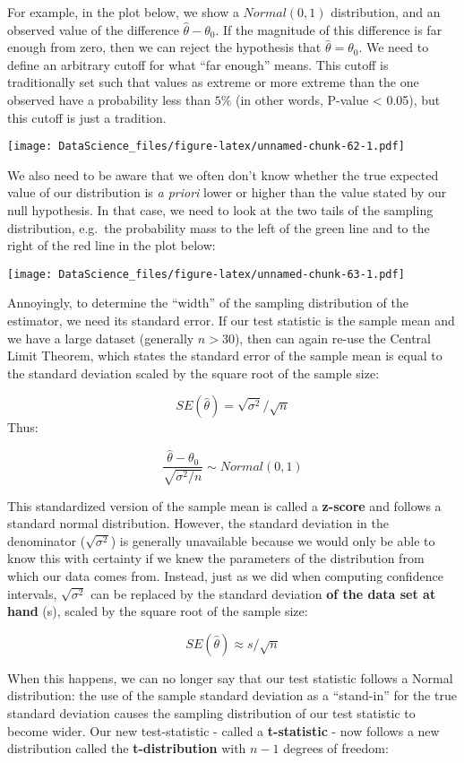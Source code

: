 \documentclass[
]{book}
\begin{document}
For example, in the plot below, we show a \(Normal(0,1)\) distribution, and an observed value of the difference \(\hat{\theta}-\theta_0\). If the magnitude of this difference is far enough from zero, then we can reject the hypothesis that \(\hat{\theta} = \theta_0\). We need to define an arbitrary cutoff for what ``far enough'' means. This cutoff is traditionally set such that values as extreme or more extreme than the one observed have a probability less than \(5\%\) (in other words, P-value \textless{} 0.05), but this cutoff is just a tradition.

\texttt{[image: DataScience\_files/figure-latex/unnamed-chunk-62-1.pdf]}

We also need to be aware that we often don't know whether the true expected value of our distribution is \emph{a priori} lower or higher than the value stated by our null hypothesis. In that case, we need to look at the two tails of the sampling distribution, e.g.~the probability mass to the left of the green line and to the right of the red line in the plot below:

\texttt{[image: DataScience\_files/figure-latex/unnamed-chunk-63-1.pdf]}

Annoyingly, to determine the ``width'' of the sampling distribution of the estimator, we need its standard error. If our test statistic is the sample mean and we have a large dataset (generally \(n>30\)), then can again re-use the Central Limit Theorem, which states the standard error of the sample mean is equal to the standard deviation scaled by the square root of the sample size:

\[SE(\hat{\theta}) = \sqrt{\sigma^2}/\sqrt{n}\]
Thus:

\[\frac{\hat{\theta} - \theta_0}{\sqrt{\sigma^2/n}} \sim Normal(0, 1)\]

This standardized version of the sample mean is called a \textbf{z-score} and follows a standard normal distribution. However, the standard deviation in the denominator (\(\sqrt{\sigma^2}\)) is generally unavailable because we would only be able to know this with certainty if we knew the parameters of the distribution from which our data comes from. Instead, just as we did when computing confidence intervals, \(\sqrt{\sigma^2}\) can be replaced by the standard deviation \textbf{of the data set at hand} (s), scaled by the square root of the sample size:

\[SE(\hat{\theta}) \approx s/\sqrt{n}\]

When this happens, we can no longer say that our test statistic follows a Normal distribution: the use of the sample standard deviation as a ``stand-in'' for the true standard deviation causes the sampling distribution of our test statistic to become wider. Our new test-statistic - called a \textbf{t-statistic} - now follows a new distribution called the \textbf{t-distribution} with \(n-1\) degrees of freedom:
\end{document}
